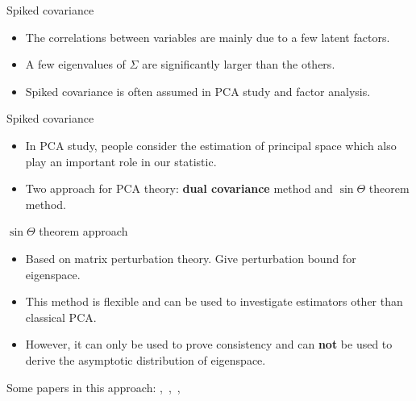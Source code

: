 \documentclass{beamer}
\theoremstyle{plain}
\theoremstyle{definition}
\theoremstyle{remark}
\begin{document}
\begin{frame}{Spiked covariance}
    \begin{itemize}
        \item
    The correlations between variables are mainly due to a few latent factors.
        \item
    A few eigenvalues of $\Sigma$ are significantly larger than the others.
        \item
            Spiked covariance is often assumed in PCA study and factor analysis.
    \end{itemize}
\end{frame}
\begin{frame}{Spiked covariance}
    \begin{itemize}
        \item
    In PCA study, people consider the estimation of principal space which also play an important role in our statistic.
\item
    Two approach for PCA theory: \textbf{dual covariance} method and $\sin\Theta$ theorem method.
    \end{itemize}

\end{frame}
\begin{frame}{$\sin \Theta$ theorem approach}
    \begin{itemize}
        \item
Based on matrix perturbation theory. Give perturbation bound for eigenspace.
        \item
    This method is flexible and can be used to investigate estimators other than classical PCA.\
\item
    However, it can only be used to prove consistency and can \textbf{not} be used to derive the asymptotic distribution of eigenspace.
    \end{itemize}
    Some papers in this approach:
\cite{Nadler2009Finite},~\cite{Ma_2013},~\cite{Cai2012Sparse},~\cite{Vu2013}
\end{frame}
\end{document}
